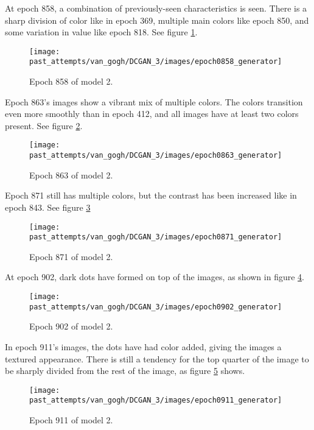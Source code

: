 \documentclass[11pt,letterpaper]{article}
\begin{document}
				At epoch 858, a combination of previously-seen characteristics is seen.
				There is a sharp division of color like in epoch 369, multiple main colors like epoch 850, and some variation in value like epoch 818.
				See figure \ref{fig:cgvg:epoch0858generator}.
				\begin{figure}
					\centering
					\texttt{[image: past\_attempts/van\_gogh/DCGAN\_3/images/epoch0858\_generator]}
					\caption{Epoch 858 of model 2.}
					\label{fig:cgvg:epoch0858generator}
				\end{figure}

				Epoch 863's images show a vibrant mix of multiple colors.
				The colors transition even more smoothly than in epoch 412, and all images have at least two colors present.
				See figure \ref{fig:cgvg:epoch0863generator}.
				\begin{figure}
					\centering
					\texttt{[image: past\_attempts/van\_gogh/DCGAN\_3/images/epoch0863\_generator]}
					\caption{Epoch 863 of model 2.}
					\label{fig:cgvg:epoch0863generator}
				\end{figure}

				Epoch 871 still has multiple colors, but the contrast has been increased like in epoch 843.
				See figure \ref{fig:cgvg:epoch0871generator}
				\begin{figure}
					\centering
					\texttt{[image: past\_attempts/van\_gogh/DCGAN\_3/images/epoch0871\_generator]}
					\caption{Epoch 871 of model 2.}
					\label{fig:cgvg:epoch0871generator}
				\end{figure}

				At epoch 902, dark dots have formed on top of the images, as shown in figure \ref{fig:cgvg:epoch0902generator}.
				\begin{figure}
					\centering
					\texttt{[image: past\_attempts/van\_gogh/DCGAN\_3/images/epoch0902\_generator]}
					\caption{Epoch 902 of model 2.}
					\label{fig:cgvg:epoch0902generator}
				\end{figure}

				In epoch 911's images, the dots have had color added, giving the images a textured appearance.
				There is still a tendency for the top quarter of the image to be sharply divided from the rest of the image, as figure \ref{fig:cgvg:epoch0911generator} shows.
				\begin{figure}
					\centering
					\texttt{[image: past\_attempts/van\_gogh/DCGAN\_3/images/epoch0911\_generator]}
					\caption{Epoch 911 of model 2.}
					\label{fig:cgvg:epoch0911generator}
				\end{figure}
\end{document}
